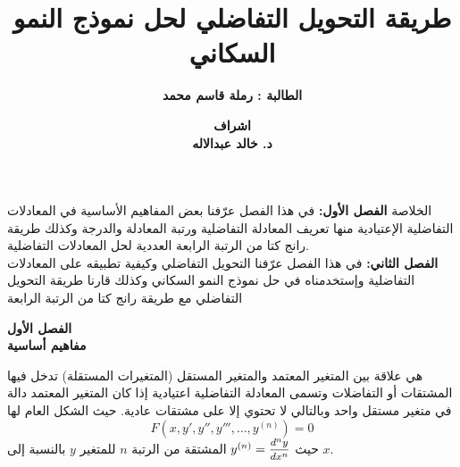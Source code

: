



	\author{\textbf{الطالبة : رملة قاسم محمد}}
	\title{\textbf{طريقة التحويل التفاضلي لحل نموذج النمو السكاني}}
	\date{\textbf{اشراف\\
			 د. خالد عبدالاله}}
	
		
		\begin{frame}
			\maketitle
		\end{frame}
		
		\begin{frame}{الخلاصة}
\textbf{الفصل الأول:} في هذا الفصل عرّفنا بعض المفاهيم الأساسية في المعادلات التفاضلية الإعتيادية منها تعريف المعادلة التفاضلية ورتبة المعادلة والدرجة وكذلك طريقة رانج كتا من الرتبة الرابعة العددية لحل المعادلات التفاضلية.\\[10pt]
\textbf{الفصل الثاني:} في هذا الفصل عرّفنا التحويل التفاضلي وكيفية تطبيقه على المعادلات التفاضلية وإستخدمناه في حل نموذج النمو السكاني وكذلك قارنا طريقة التحويل التفاضلي مع طريقة رانج كتا من الرتبة الرابعة
		\end{frame}
		
		\begin{frame}
			\begin{center}
				\Huge
				\textbf{الفصل الأول}\\
				\textbf{مفاهيم أساسية}
			\end{center}
		\end{frame}
		
		\begin{frame}
			\begin{definition}
				    هي علاقة بين المتغير المعتمد والمتغير المستقل (المتغيرات المستقلة) تدخل فيها المشتقات أو التفاضلات وتسمى المعادلة التفاضلية اعتيادية إذا كان المتغير المعتمد دالة في متغير مستقل واحد وبالتالي لا تحتوي إلا على مشتقات عادية. حيث الشكل العام لها
				\[
				F(x,y',y'',y''',\dots,y^{(n)})=0
				\]
				حيث $y^{(n)}=\mfrac{d^ny}{dx^n}$ المشتقة من الرتبة $n$ للمتغير $y$ بالنسبة إلى $x$.
			\end{definition}
		\end{frame}
		
